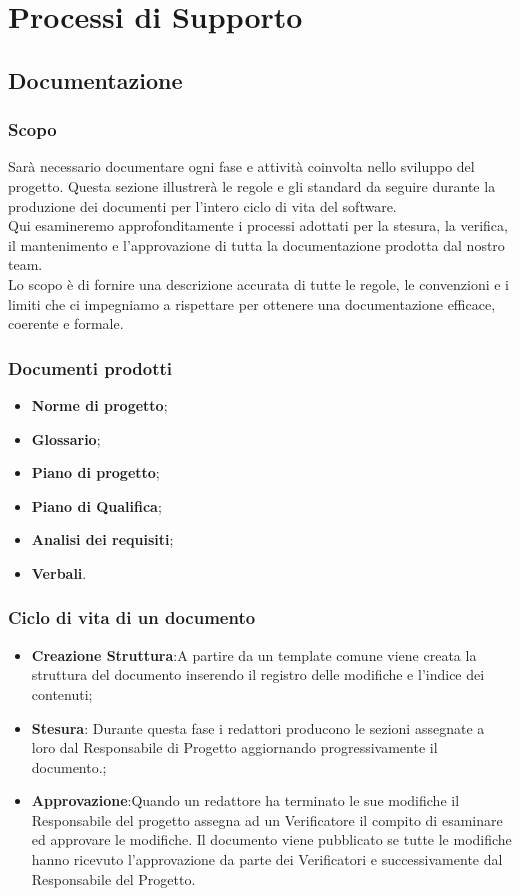 \section{Processi di Supporto}

\subsection{Documentazione}
\subsubsection{Scopo}
Sarà necessario documentare ogni fase e attività coinvolta nello sviluppo del progetto. Questa sezione illustrerà le regole e gli standard da seguire durante la produzione 
dei documenti per l'intero ciclo di vita del software. \\
Qui esamineremo approfonditamente i processi adottati per la stesura, la verifica, il mantenimento e l’approvazione di tutta la documentazione prodotta dal nostro team. \\
Lo scopo è di fornire una descrizione accurata di tutte le regole, le convenzioni e i limiti che ci impegniamo a rispettare per ottenere una documentazione efficace, coerente e formale.\\

\subsubsection{Documenti prodotti}
\begin{itemize}
    \item \textbf{Norme di progetto};
    \item \textbf{Glossario};
    \item \textbf{Piano di progetto};
    \item \textbf{Piano di Qualifica};
    \item \textbf{Analisi dei requisiti};
    \item \textbf{Verbali}.
\end{itemize}

\subsubsection{Ciclo di vita di un documento}
\begin{itemize}
    \item \textbf{Creazione Struttura}:A partire da un template comune viene creata la struttura del documento inserendo il registro delle modifiche e l’indice dei contenuti;
    \item \textbf{Stesura}: Durante questa fase i redattori producono le sezioni assegnate a loro dal Responsabile di Progetto aggiornando progressivamente il documento.;
    \item \textbf{Approvazione}:Quando un redattore ha terminato le sue modifiche il Responsabile del progetto assegna ad un Verificatore il compito di esaminare ed approvare le modifiche.
Il documento viene pubblicato se tutte le modifiche hanno ricevuto l’approvazione da parte dei Verificatori e successivamente dal Responsabile del Progetto.
\end{itemize}
\newpage
